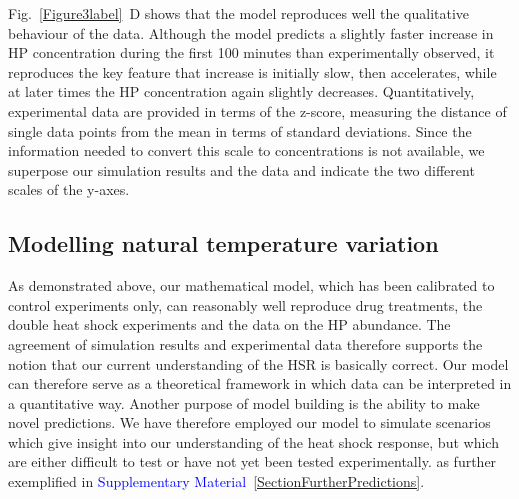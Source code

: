 \documentclass[oneside, 10pt, a4paper, twocolumn]{article}
\begin{document}
Fig.~\ref{Figure3label}~D shows that the model reproduces well the qualitative behaviour of the data.
Although the model predicts a slightly faster increase in HP concentration during the first
100 minutes than experimentally observed, it reproduces the key feature that increase is initially slow,
then accelerates, while at later times the HP concentration again slightly decreases. 
Quantitatively, experimental data are provided in terms of the z-score, 
measuring the distance of single data points from the mean in terms of standard deviations. 
Since the information needed to convert this scale to concentrations is not available, 
we superpose our simulation results and the data and  indicate the two different  scales of the y-axes. %





\subsection{Modelling natural temperature variation}
\label{SecHotDay}
\label{MaximalHPtau}

As demonstrated above, our mathematical model, which has been calibrated to control experiments only, 
can reasonably well reproduce drug treatments, the double heat shock experiments and the data on the HP abundance.
The agreement of simulation results and experimental data therefore supports the notion that our current understanding of the HSR is basically correct. Our model can therefore serve as a theoretical framework in which
data can be interpreted in a quantitative way.
Another purpose of model building is the ability to make novel predictions.
We have therefore employed our model to simulate scenarios which give insight into our understanding of the heat shock response, but which are either difficult to test or have not yet been tested experimentally. as further exemplified in \textcolor{blue}{Supplementary Material~\ref{SectionFurtherPredictions}}.
\end{document}
